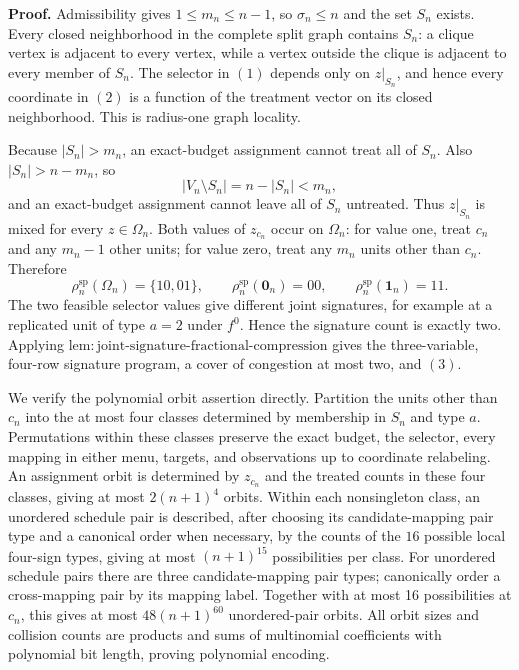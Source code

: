 \textbf{Proof.}
Admissibility gives \(1\le m_n\le n-1\), so \(\sigma_n\le n\) and the set \(S_n\) exists. Every closed neighborhood in the complete split graph contains \(S_n\): a clique vertex is adjacent to every vertex, while a vertex outside the clique is adjacent to every member of \(S_n\). The selector in \((1)\) depends only on \(z|_{S_n}\), and hence every coordinate in \((2)\) is a function of the treatment vector on its closed neighborhood. This is radius-one graph locality.

Because \(|S_n|>m_n\), an exact-budget assignment cannot treat all of \(S_n\). Also \(|S_n|>n-m_n\), so
\[
 |V_n\setminus S_n|=n-|S_n|<m_n,
\]
and an exact-budget assignment cannot leave all of \(S_n\) untreated. Thus \(z|_{S_n}\) is mixed for every \(z\in\Omega_n\). Both values of \(z_{c_n}\) occur on \(\Omega_n\): for value one, treat \(c_n\) and any \(m_n-1\) other units; for value zero, treat any \(m_n\) units other than \(c_n\). Therefore
\[
 \rho_n^{\mathrm{sp}}(\Omega_n)=\{10,01\},
 \qquad
 \rho_n^{\mathrm{sp}}(\mathbf 0_n)=00,
 \qquad
 \rho_n^{\mathrm{sp}}(\mathbf 1_n)=11. \tag{5}
\]
The two feasible selector values give different joint signatures, for example at a replicated unit of type \(a=2\) under \(f^0\). Hence the signature count is exactly two. Applying \(\mathrm{lem{:}joint\text{-}signature\text{-}fractional\text{-}compression}\) gives the three-variable, four-row signature program, a cover of congestion at most two, and \((3)\).

We verify the polynomial orbit assertion directly. Partition the units other than \(c_n\) into the at most four classes determined by membership in \(S_n\) and type \(a\). Permutations within these classes preserve the exact budget, the selector, every mapping in either menu, targets, and observations up to coordinate relabeling. An assignment orbit is determined by \(z_{c_n}\) and the treated counts in these four classes, giving at most \(2(n+1)^4\) orbits. Within each nonsingleton class, an unordered schedule pair is described, after choosing its candidate-mapping pair type and a canonical order when necessary, by the counts of the \(16\) possible local four-sign types, giving at most \((n+1)^{15}\) possibilities per class. For unordered schedule pairs there are three candidate-mapping pair types; canonically order a cross-mapping pair by its mapping label. Together with at most 16 possibilities at \(c_n\), this gives at most \(48(n+1)^{60}\) unordered-pair orbits. All orbit sizes and collision counts are products and sums of multinomial coefficients with polynomial bit length, proving polynomial encoding.


